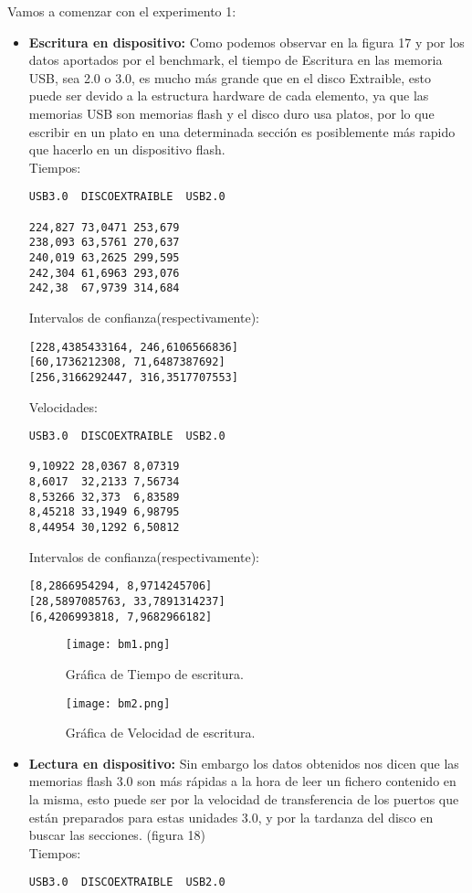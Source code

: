 \documentclass[a4paper, 10pt]{article} %
\begin{document}
\pagebreak

Vamos a comenzar con el experimento 1:
\begin{itemize}
\item \textbf{Escritura en dispositivo:}
Como podemos observar en la figura 17 y por los datos aportados por el benchmark, el tiempo de Escritura en las memoria USB, sea 2.0 o 3.0, es mucho más grande que en el disco Extraible, esto puede ser devido a la estructura hardware de cada elemento, ya que las memorias USB son memorias flash y el disco duro usa platos, por lo que escribir en un plato en una determinada sección es posiblemente más rapido que hacerlo en un dispositivo flash.\\
Tiempos:
\begin{verbatim}
USB3.0	DISCOEXTRAIBLE	USB2.0
	
224,827	73,0471	253,679
238,093	63,5761	270,637
240,019	63,2625	299,595
242,304	61,6963	293,076
242,38	67,9739	314,684

\end{verbatim}
Intervalos de confianza(respectivamente): 
\begin{verbatim}
[228,4385433164, 246,6106566836]
[60,1736212308, 71,6487387692]
[256,3166292447, 316,3517707553]
\end{verbatim}
Velocidades:
\begin{verbatim}
USB3.0	DISCOEXTRAIBLE	USB2.0
	
9,10922	28,0367	8,07319
8,6017	32,2133	7,56734
8,53266	32,373	6,83589
8,45218	33,1949	6,98795
8,44954	30,1292	6,50812

\end{verbatim}
Intervalos de confianza(respectivamente): 
\begin{verbatim}
[8,2866954294, 8,9714245706]
[28,5897085763, 33,7891314237]
[6,4206993818, 7,9682966182]
\end{verbatim}
\begin{figure}[H]
\centering 
\texttt{[image: bm1.png]} 
\caption{Gráfica de Tiempo de escritura.} 
\label{contexto:figura} 
\end{figure}
\begin{figure}[H]
\centering 
\texttt{[image: bm2.png]} 
\caption{Gráfica de Velocidad de escritura.} 
\label{contexto:figura} 
\end{figure}
\item \textbf{Lectura en dispositivo:} Sin embargo los datos obtenidos nos dicen que las memorias flash 3.0 son más rápidas a la hora de leer un fichero contenido en la misma, esto puede ser por la velocidad de transferencia de los puertos que están preparados para estas unidades 3.0, y por la tardanza del disco en buscar las secciones. (figura 18)\\
Tiempos:
\begin{verbatim}
USB3.0	DISCOEXTRAIBLE	USB2.0


\end{verbatim}
\end{itemize}
\end{document}
